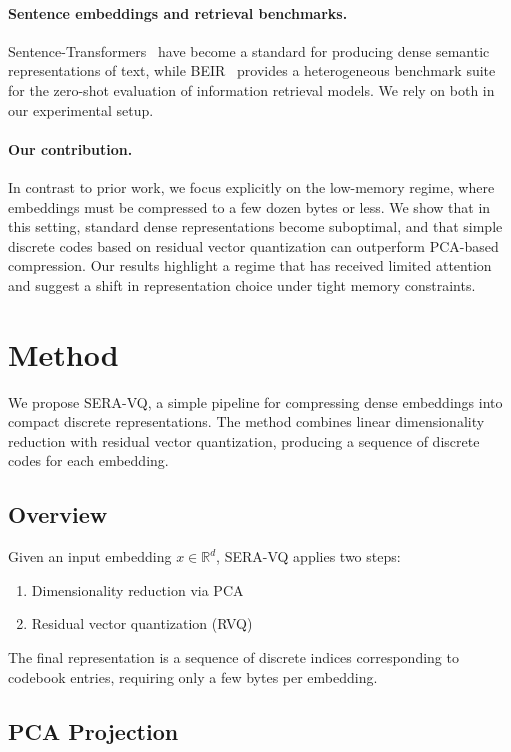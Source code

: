 \documentclass{article}
\begin{document}
\paragraph{Sentence embeddings and retrieval benchmarks.}
Sentence-Transformers~\cite{sbert} have become a standard for producing dense semantic representations of text, while BEIR~\cite{beir} provides a heterogeneous benchmark suite for the zero-shot evaluation of information retrieval models. We rely on both in our experimental setup.

\paragraph{Our contribution.}
In contrast to prior work, we focus explicitly on the low-memory regime, where embeddings must be compressed to a few dozen bytes or less. We show that in this setting, standard dense representations become suboptimal, and that simple discrete codes based on residual vector quantization can outperform PCA-based compression. Our results highlight a regime that has received limited attention and suggest a shift in representation choice under tight memory constraints.

\section{Method}

We propose SERA-VQ, a simple pipeline for compressing dense embeddings into compact discrete representations. The method combines linear dimensionality reduction with residual vector quantization, producing a sequence of discrete codes for each embedding.

\subsection{Overview}

Given an input embedding $x \in \mathbb{R}^d$, SERA-VQ applies two steps:

\begin{enumerate}
    \item Dimensionality reduction via PCA
    \item Residual vector quantization (RVQ)
\end{enumerate}

The final representation is a sequence of discrete indices corresponding to codebook entries, requiring only a few bytes per embedding.

\subsection{PCA Projection}
\end{document}

